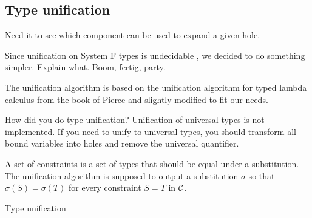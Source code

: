 \subsection{Type unification}

Need it to see which component can be used to expand a given hole.

Since unification on System F types is undecidable \cite{Huet1975}, we decided to do something simpler. Explain what. Boom, fertig, party.

The unification algorithm is based on the unification algorithm for typed lambda calculus from the book of Pierce  and slightly modified to fit our needs.
  
How did you do type unification?
Unification of universal types is not implemented. If you need to unify to universal types, you should transform all bound variables into holes and remove the universal quantifier.

A set of constraints is a set of types that should be equal under a substitution. The unification algorithm is supposed to output a substitution $\sigma$ so that $\sigma(S) = \sigma(T)$ for every constraint $S = T$ in $\mathcal{C}$.

\begin{algorithm}
\caption{Type unification}

\end{algorithm} 

